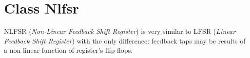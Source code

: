 \chapter{Class Nlfsr}

NLFSR (\textit{Non-Linear Feedback Shift Register}) is very similar to LFSR (\textit{Linear Feedback Shift Register}) with the only difference: feedback taps may be results of a non-linear function of register's flip-flops.
